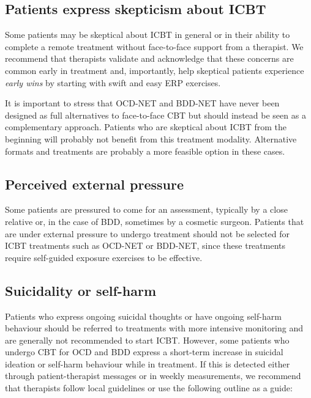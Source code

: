 \documentclass[]{book}
\theoremstyle{definition}
\theoremstyle{definition}
\theoremstyle{definition}
\theoremstyle{remark}
\begin{document}
\hypertarget{patients-express-skepticism-about-icbt}{%
\subsection{Patients express skepticism about
ICBT}\label{patients-express-skepticism-about-icbt}}

Some patients may be skeptical about ICBT in general or in their ability
to complete a remote treatment without face-to-face support from a
therapist. We recommend that therapists validate and acknowledge that
these concerns are common early in treatment and, importantly, help
skeptical patients experience \emph{early wins} by starting with swift
and easy ERP exercises.

It is important to stress that OCD-NET and BDD-NET have never been
designed as full alternatives to face-to-face CBT but should instead be
seen as a complementary approach. Patients who are skeptical about ICBT
from the beginning will probably not benefit from this treatment
modality. Alternative formats and treatments are probably a more
feasible option in these cases.

\hypertarget{perceived-external-pressure}{%
\subsection{Perceived external
pressure}\label{perceived-external-pressure}}

Some patients are pressured to come for an assessment, typically by a
close relative or, in the case of BDD, sometimes by a cosmetic surgeon.
Patients that are under external pressure to undergo treatment should
not be selected for ICBT treatments such as OCD-NET or BDD-NET, since
these treatments require self-guided exposure exercises to be effective.

\hypertarget{suicidality-or-self-harm}{%
\subsection{Suicidality or self-harm}\label{suicidality-or-self-harm}}

Patients who express ongoing suicidal thoughts or have ongoing self-harm
behaviour should be referred to treatments with more intensive
monitoring and are generally not recommended to start ICBT. However,
some patients who undergo CBT for OCD and BDD express a short-term
increase in suicidal ideation or self-harm behaviour while in treatment.
If this is detected either through patient-therapist messages or in
weekly measurements, we recommend that therapists follow local
guidelines or use the following outline as a guide:
\end{document}
